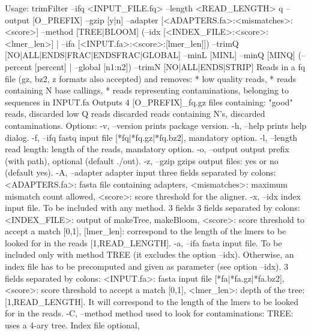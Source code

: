 \begin{DoxyCode}
Usage: trimFilter --ifq <INPUT\_FILE.fq> --length <READ\_LENGTH>
q                  --output [O\_PREFIX] --gzip [y|n]
                  --adapter [<ADAPTERS.fa>:<mismatches>:<score>]
                  --method [TREE|BLOOM]
                  (--idx [<INDEX\_FILE>:<score>:<lmer\_len>] |
                   --ifa [<INPUT.fa>:<score>:[lmer\_len]])
                  --trimQ [NO|ALL|ENDS|FRAC|ENDSFRAC|GLOBAL]
                  --minL [MINL]  --minQ [MINQ]
                  (--percent [percent] | --global [n1:n2])
                  --trimN [NO|ALL|ENDS|STRIP]
Reads in a fq file (gz, bz2, z formats also accepted) and removes:
  * low quality reads,
  * reads containing N base callings,
  * reads representing contaminations, belonging to sequences in INPUT.fa
Outputs 4 [O\_PREFIX]\_fq.gz files containing: "good" reads, discarded
low Q reads discarded reads containing N's, discarded contaminations.
Options:
 -v, --version prints package version.
 -h, --help    prints help dialog.
 -f, --ifq     fastq input file [*fq|*fq.gz|*fq.bz2], mandatory option.
 -l, --length  read length: length of the reads, mandatory option.
 -o, --output  output prefix (with path), optional (default ./out).
 -z, --gzip    gzips output files: yes or no (default yes).
 -A, --adapter adapter input three fields separated by colons:
               <ADAPTERS.fa>: fasta file containing adapters,
               <mismatches>: maximum mismatch count allowed,
               <score>: score threshold  for the aligner.
 -x, --idx     index input file. To be included with any method. 3 fields
               3 fields separated by colons:
               <INDEX\_FILE>: output of makeTree, makeBloom,
               <score>: score threshold to accept a match [0,1],
               [lmer\_len]: correspond to the length of the lmers to be
                        looked for in the reads [1,READ\_LENGTH].
 -a, --ifa     fasta input file. To be included only with method TREE
               (it excludes the option --idx). Otherwise, an
               index file has to be precomputed and given as parameter
               (see option --idx). 3 fields separated by colons:
               <INPUT.fa>: fasta input file [*fa|*fa.gz|*fa.bz2],
               <score>: score threshold to accept a match [0,1],
               <lmer\_len>: depth of the tree: [1,READ\_LENGTH]. It will
                        correspond to the length of the lmers to be
                        looked for in the reads.
 -C, --method  method used to look for contaminations:
               TREE:  uses a 4-ary tree. Index file optional,

\end{DoxyCode}
